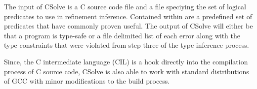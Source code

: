 The input of CSolve is a C source code file and a file speciying the set of logical predicates to use in refinement inference. Contained within are a predefined set of predicates that have commonly proven useful. The output of CSolve will either be that a program is type-safe or a file delimited list of each error along with the type constraints that were violated from step three of the type inference process.

Since, the C intermediate language (CIL) is a hook directly into the compilation process of C source code, CSolve is also able to work with standard distributions of GCC with minor modifications to the build process.

% 


